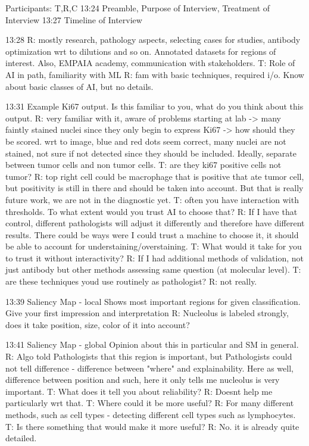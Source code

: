 Participants: T,R,C
13:24 Preamble, Purpose of Interview, Treatment of Interview
13:27 Timeline of Interview

13:28 R: mostly research, pathology aspects, selecting cases for studies, antibody optimization wrt to dilutions and so on. Annotated datasets for regions of interest. Also, EMPAIA academy, communication with stakeholders. T: Role of AI in path, familiarity with ML R: fam with basic techniques, required i/o. Know about basic classes of AI, but no details.

13:31 Example Ki67 output. 
Is this familiar to you, what do you think about this output. R: very familiar with it, aware of problems starting at lab -> many faintly stained nuclei since they only begin to express Ki67 -> how should they be scored. wrt to image, blue and red dots seem correct, many nuclei are not stained, not sure if not detected since they should be included. Ideally, separate between tumor cells and non tumor cells. 
T: are they ki67 positive cells not tumor? R: top right cell could be macrophage that is positive that ate tumor cell, but positivity is still in there and should be taken into account. But that is really future work, we are not in the diagnostic yet.
T: often you have interaction with thresholds. To what extent would you trust AI to choose that? R: If I have that control, different pathologists will adjust it differently and therefore have different results. There could be ways were I could trust a machine to choose it, it should be able to account for understaining/overstaining. T: What would it take for you to trust it without interactivity? R: If I had additional methods of validation, not just antibody but other methods assessing same question (at molecular level).
T: are these techniques youd use routinely as pathologist? R: not really.

13:39 Saliency Map - local
Shows most important regions for given classification. Give your first impression and interpretation
R: Nucleolus is labeled strongly, does it take position, size, color of it into account?

13:41 Saliency Map - global
Opinion about this in particular and SM in general. R: Algo told Pathologists that this region is important, but Pathologists could not tell difference - difference between "where" and explainability. Here as well, difference between position and such, here it only tells me nucleolus is very important.
T: What does it tell you about reliability? R: Doesnt help me particularly wrt that.
T: Where could it be more useful? R: For many different methods, such as cell types - detecting different cell types such as lymphocytes.
T: Is there something that would make it more useful? R: No. it is already quite detailed.

